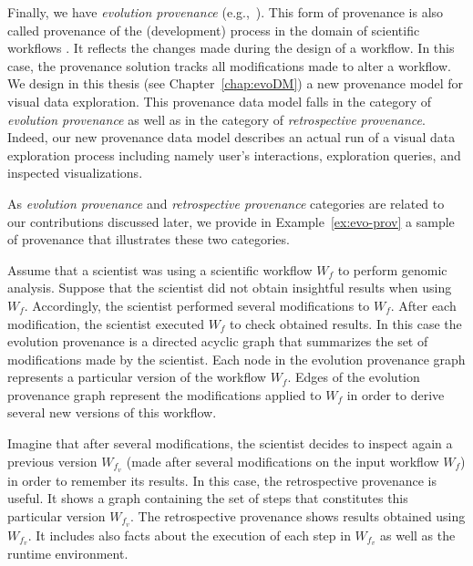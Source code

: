 Finally, we have \emph{evolution provenance} (e.g.,~\cite{Callahan06, Altintas2006}). This form of provenance is also called provenance of the (development) process in the domain of scientific workflows \cite{Missier2013}. 
It reflects the changes made during the design of a workflow. In this case, the provenance solution tracks all modifications made to alter a workflow. 
We design in this thesis (see Chapter~\ref{chap:evoDM}) a new provenance model for visual data exploration.
This provenance data model falls in the category of \emph{evolution provenance} as well as in the category of \emph{retrospective provenance}.
Indeed, our new provenance data model describes an actual run of a visual data exploration process including namely user's interactions, exploration queries, and inspected visualizations.




As \emph{evolution provenance} and \emph{retrospective provenance} categories are related to our contributions discussed later, we provide in Example~\ref{ex:evo-prov} a sample of provenance that illustrates these two categories.


\begin{example}
\label{ex:evo-prov}
Assume that a scientist was using a scientific workflow $W_f$ to perform genomic analysis.
Suppose that the scientist did not obtain insightful results when using $W_f$.
Accordingly, the scientist performed several modifications to $W_f$. After each modification, the scientist executed $W_f$ to check obtained results.
In this case the evolution provenance is a directed acyclic graph that summarizes the set of modifications made by the scientist. Each node in the evolution provenance graph represents a particular version of the workflow $W_f$. Edges of the evolution provenance graph represent the modifications applied to $W_f$ in order to derive several new versions of this workflow. 

Imagine that after several modifications, the scientist decides to inspect again a previous version $W_{f_v}$ (made after several modifications on the input workflow $W_f$) in order to remember its results.
In this case, the retrospective provenance is useful. It shows a graph containing the set of steps that constitutes this particular version $W_{f_v}$.
The retrospective provenance shows results obtained using $W_{f_v}$. It includes also facts about the execution of each step in $W_{f_v}$ as well as the runtime environment.
\end{example}


